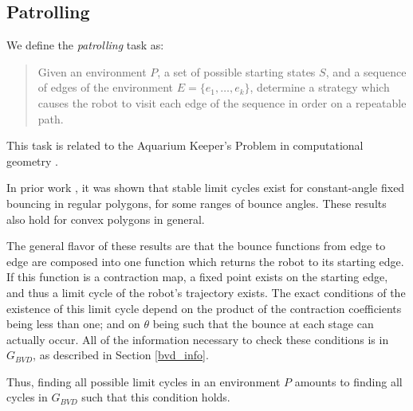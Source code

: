 \documentclass[]{svproc}  %
\begin{document}
\subsection{Patrolling \label{patrol}}

We define the \emph{patrolling} task as:

\begin{quotation}
Given an environment $P$, a set of possible starting states $S$, and
a sequence of edges of the environment $E = \{e_1, \ldots, e_k\}$,
determine a strategy which causes the robot to visit each edge of the sequence
in order on a repeatable path.
\end{quotation}

This task is related to the Aquarium Keeper's Problem in computational
geometry \cite{czyzowicz1991aquarium}.

In prior work \cite{NilBecLav17}, it was shown that stable limit cycles
exist for constant-angle fixed bouncing in regular polygons, for some ranges of bounce angles.
These results also hold for convex polygons in general.

The general flavor of these results are that the bounce functions from edge to
edge are composed into one function which returns the robot to its starting
edge. If this function is a contraction map, a fixed point exists on the
starting edge, and thus a limit cycle of the robot's trajectory exists. The
exact conditions of the existence of this limit cycle depend on the product of
the contraction coefficients being less than one; and on $\theta$ being such
that the bounce at each stage can actually occur. All of the information
necessary to check these conditions is in $G_{BVD}$, as described in Section
\ref{bvd_info}.

Thus, finding all possible limit cycles in an environment $P$ amounts to finding
all cycles in $G_{BVD}$ such that this condition holds.
\end{document}
